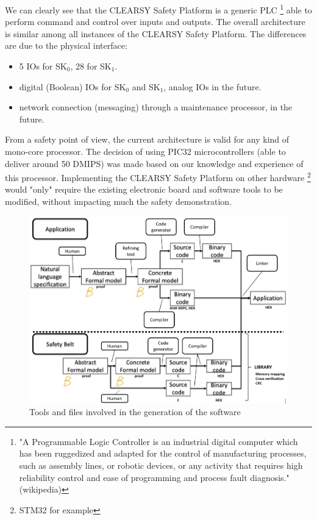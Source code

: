We can clearly see that the CLEARSY Safety Platform is a generic PLC \footnote{"A Programmable Logic Controller is an industrial digital computer which has been ruggedized and adapted for the control of manufacturing processes, such as assembly lines, or robotic devices, or any activity that requires high reliability control and ease of programming and process fault diagnosis." (wikipedia)} able to perform command and control over inputs and outputs. The overall architecture is similar among all instances of the CLEARSY Safety Platform. The differences are due to the physical interface:
\begin{itemize}
    \item 5 IOs for SK$_0$, 28 for SK$_1$.
    \item digital (Boolean) IOs for SK$_0$ and SK$_1$, analog IOs in the future.
    \item network connection (messaging) through a maintenance processor, in the future.
\end{itemize}

\begin{remark}
From a safety point of view, the current architecture is valid for any kind of mono-core processor. The decision of using PIC32 microcontrollers (able to deliver around 50 DMIPS) was made based on our knowledge and experience of this processor. Implementing the CLEARSY Safety Platform on other hardware \footnote{STM32 for example} would "only" require the existing electronic board and software tools to be modified, without impacting much the safety demonstration.
\end{remark} 

\begin{figure}[h]
\centering\includegraphics[scale=0.35]{Pictures/chapterSafetyPrinciples/ARCH-LCHIP-process.jpg}
\caption{Tools and files involved in the generation of the software}
\label{arch:process}
\end{figure}



